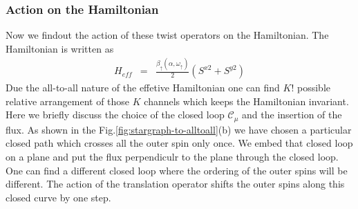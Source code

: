 \documentclass[reprint,prb,superscriptaddress]{revtex4-1}
\begin{document}
\subsubsection{Action on the Hamiltonian}
Now we findout the action of these twist operators on the Hamiltonian. The Hamiltonian is written as 
\begin{eqnarray}
H_{eff}&=& \frac{\beta_{\uparrow}(\alpha,\omega_{\uparrow})}{2} (S^{x2} +S^{y2})   
\end{eqnarray}
Due the all-to-all nature of the effetive Hamiltonian one can find $K!$ possible relative arrangement of those $K$ channels which keeps the Hamiltonian invariant. Here we briefly discuss the choice of the closed loop $\mathcal{C}_{\mu}$ and the insertion of the flux. As shown in the Fig.\ref{fig:stargraph-to-alltoall}(b) we have chosen a particular closed path which crosses all the outer spin only once. We embed that closed loop on a plane and put the flux perpendiculr to the plane through the closed loop. One can find a different closed loop where the ordering of the outer spins will be different. The action of the translation operator shifts the outer spins along this closed curve by one step.
\end{document}
